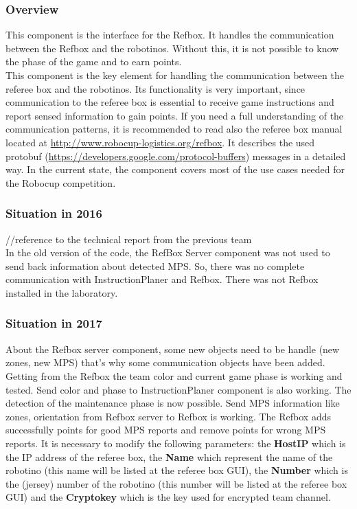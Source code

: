 
\subsubsection{Overview}

This component is the interface for the Refbox. It handles the communication between the Refbox and the robotinos. Without this, it is not possible to know the phase of the game and to earn points. \\

This component is the key element for handling the communication between the referee box and the robotinos. Its functionality is very important, since communication to the referee box is essential to receive game instructions and report sensed information to gain points. If you need a full understanding of the communication patterns, it is recommended to read also the referee box manual located at \url{ http://www.robocup-logistics.org/refbox}. It describes the used protobuf (\url{https://developers.google.com/protocol-buffers}) messages in a detailed way. In the current state, the component covers most of the use cases needed for the Robocup competition.


\subsubsection{Situation in 2016}

//reference to the technical report from the previous team \\

In the old version of the code, the RefBox Server component was not used to send back information about detected MPS. So, there was no complete communication with InstructionPlaner and Refbox. There was not Refbox installed in the laboratory. 


\subsubsection{Situation in 2017}

About the Refbox server component, some new objects need to be handle (new zones, new MPS) that's why some communication objects have been added. Getting from the Refbox the team color and current game phase is working and tested. Send color and phase to InstructionPlaner component is also working. The detection of the maintenance phase is now possible. Send MPS information like zones, orientation from Refbox server to Refbox is working. The Refbox adds successfully points for good MPS reports and remove points for wrong MPS reports. It is necessary to modify the following parameters: the \textbf{HostIP} which is the IP address of the referee box, the \textbf{Name} which represent the name of the robotino (this name will be listed at the referee box GUI), the \textbf{Number} which is the (jersey) number of the robotino (this number will be listed at the referee box GUI) and the \textbf{Cryptokey} which is the key used for encrypted team channel.\\

